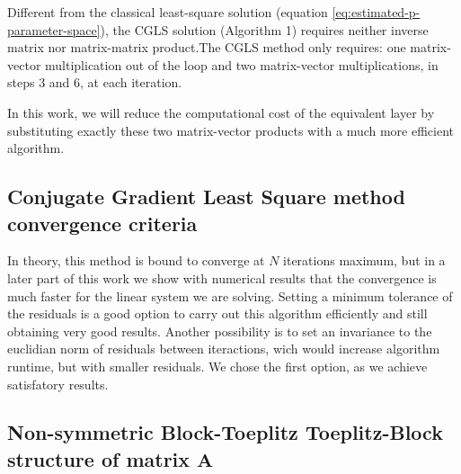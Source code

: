 Different from the classical least-square solution (equation \ref{eq:estimated-p-parameter-space}), the CGLS solution (Algorithm 1) requires neither inverse matrix nor matrix-matrix product.The CGLS method only requires: one matrix-vector multiplication out of the loop and two matrix-vector multiplications, in steps 3 and 6, at each iteration. 

In this work, we will reduce the computational cost of the equivalent layer by substituting exactly these two matrix-vector products with a much more efficient algorithm.

\subsection{Conjugate Gradient Least Square method convergence criteria}

In theory, this method is bound to converge at $N$ iterations maximum, but in a later part of this work we show with numerical results that the convergence is much faster for the linear system we are solving. Setting a minimum tolerance of the residuals is a good option to carry out this algorithm efficiently and still obtaining very good results. Another possibility is to set an invariance to the euclidian norm of residuals between iteractions, wich would increase algorithm runtime, but with smaller residuals. We chose the first option, as we achieve satisfatory results.

\subsection{Non-symmetric Block-Toeplitz Toeplitz-Block structure of matrix $\mathbf{A}$}

